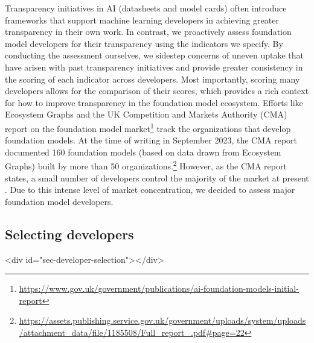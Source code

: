 \documentclass[screen, authorversion, acmsmall]{acmart}
\begin{document}
\noindent Transparency initiatives in AI (\eg datasheets and model cards) often introduce frameworks that support machine learning developers in achieving greater transparency in their own work.
In contrast, we proactively assess foundation model developers for their transparency using the \numindicators indicators we specify.
By conducting the assessment ourselves, we sidestep concerns of uneven uptake that have arisen with past transparency initiatives \citep[\eg][]{gebru2018datasheets, mitchell2018modelcards} and provide greater consistency in the scoring of each indicator across developers.
Most importantly, scoring many developers allows for the comparison of their scores, which provides a rich context for how to improve transparency in the foundation model ecosystem.
Efforts like Ecosystem Graphs \citep{bommasani2023ecosystem} and the UK Competition and Markets Authority (CMA) report on the foundation model market\footnote{\url{https://www.gov.uk/government/publications/ai-foundation-models-initial-report}} track the organizations that develop foundation models.
At the time of writing in September 2023, the CMA report documented 160 foundation models (based on data drawn from Ecosystem Graphs) built by more than 50 organizations.\footnote{\url{https://assets.publishing.service.gov.uk/government/uploads/system/uploads/attachment_data/file/1185508/Full_report\_.pdf\#page=22}} 
However, as the CMA report states, a small number of developers control the majority of the market at present \citep{vipra2023concentration}.
Due to this intense level of market concentration, we decided to assess \numcompanies major foundation model developers.\clearpage

\hypertarget{developer-selection}{\subsection{Selecting developers}}
<div id="sec-developer-selection"></div>
\end{document}
